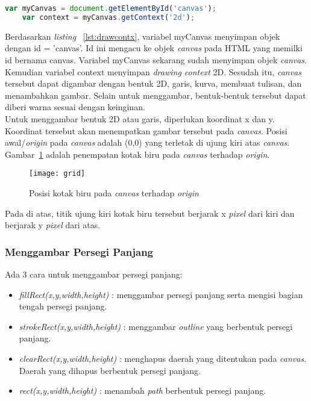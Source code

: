 \begin{lstlisting}[language=Javascript, caption=Menambahkan \textit{drawing context canvas}, label={lst:drawcontx} ]
	var myCanvas = document.getElementById('canvas');
	var context = myCanvas.getContext('2d');
\end{lstlisting}

Berdasarkan \textit{listing} ~\ref{lst:drawcontx}, variabel myCanvas menyimpan objek dengan id = 'canvas'. Id ini mengacu ke objek \textit{canvas} pada HTML yang memilki id bernama canvas. Variabel myCanvas sekarang sudah menyimpan objek \textit{canvas}. Kemudian variabel context menyimpan \textit{drawing context} 2D. Sesudah itu, \textit{canvas} tersebut dapat digambar dengan bentuk 2D, garis, kurva, membuat tulisan, dan menambahkan gambar. Selain untuk menggambar, bentuk-bentuk tersebut dapat diberi warna sesuai dengan keinginan.\\

Untuk menggambar bentuk 2D atau garis, diperlukan koordinat x dan y. Koordinat tersebut akan menempatkan gambar tersebut pada \textit{canvas}. Posisi awal/\textit{origin} pada \textit{canvas} adalah (0,0) yang terletak di ujung kiri atas \textit{canvas}. Gambar~\ref{fig:grid} adalah penempatan kotak biru pada \textit{canvas} terhadap \textit{origin}.

\begin{figure}[H]
	\centering  
	\texttt{[image: grid]}
	\caption[Posisi kotak biru pada \textit{canvas} terhadap \textit{origin}]{Posisi kotak biru pada \textit{canvas} terhadap \textit{origin}\cite{MDN:05:Web}}
	\label{fig:grid} 
\end{figure} 

Pada di atas, titik ujung kiri kotak biru tersebut berjarak x \textit{pixel} dari kiri dan berjarak y \textit{pixel} dari atas. 

\subsubsection{Menggambar Persegi Panjang}
Ada 3 cara untuk menggambar persegi panjang:

\begin{itemize}
	\item \textit{fillRect(x,y,width,height)} : menggambar persegi panjang serta mengisi bagian tengah persegi panjang.
	\item \textit{strokeRect(x,y,width,height)} : menggambar \textit{outline} yang berbentuk persegi panjang.
	\item \textit{clearRect(x,y,width,height)} : menghapus daerah yang ditentukan pada \textit{canvas}. Daerah yang dihapus berbentuk persegi panjang.
	\item \textit{rect(x,y,width,height)} : menambah \textit{path} berbentuk persegi panjang.
\end{itemize}

